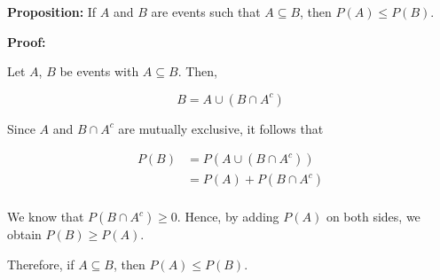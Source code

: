 \documentclass{article}
\begin{document}
\textbf{Proposition:} If $A$ and $B$ are events such that $A \subseteq B$, then $P(A) \leq P(B)$.

\textbf{Proof:}

Let $A$, $B$ be events with $A \subseteq B$. Then,

\begin{equation*}
B=A \cup (B \cap A^c)
\end{equation*}

Since $A$ and $B \cap A^c$ are mutually exclusive, it follows that

\begin{align*}
P(B) &= P(A \cup (B \cap A^c)) \\
&= P(A) + P(B \cap A^c) \\
\end{align*}

We know that $P(B \cap A^c) \geq 0$. Hence,
by adding $P(A)$ on both sides, we obtain $P(B) \geq P(A)$.

Therefore, if $A \subseteq B$, then $P(A) \leq P(B)$.
\end{document}

